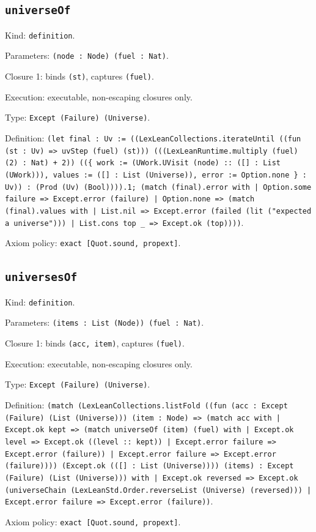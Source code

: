 \documentclass[11pt]{article}
\begin{document}
\subsection*{\texttt{universeOf}}
\noindent Kind: \texttt{definition}.\par
\noindent Parameters: \texttt{(node : Node) (fuel : Nat)}.\par
\noindent Closure 1: binds \texttt{(st)}, captures \texttt{(fuel)}.\par
\noindent Execution: executable, non-escaping closures only.\par
\noindent Type: \texttt{Except (Failure) (Universe)}.\par
\noindent Definition: \texttt{(let final : Uv := ((LexLeanCollections.iterateUntil ((fun (st : Uv) => uvStep (fuel) (st))) (((LexLeanRuntime.multiply (fuel) (2) : Nat) + 2)) ((\{ work := (UWork.UVisit (node) :: ([] : List (UWork))), values := ([] : List (Universe)), error := Option.none \} : Uv)) : (Prod (Uv) (Bool)))).1; (match (final).error with | Option.some failure => Except.error (failure) | Option.none => (match (final).values with | List.nil => Except.error (failed (lit ("expected a universe"))) | List.cons top \_ => Except.ok (top))))}.\par
\noindent Axiom policy: \texttt{exact [Quot.sound, propext]}.\par
\subsection*{\texttt{universesOf}}
\noindent Kind: \texttt{definition}.\par
\noindent Parameters: \texttt{(items : List (Node)) (fuel : Nat)}.\par
\noindent Closure 1: binds \texttt{(acc, item)}, captures \texttt{(fuel)}.\par
\noindent Execution: executable, non-escaping closures only.\par
\noindent Type: \texttt{Except (Failure) (Universe)}.\par
\noindent Definition: \texttt{(match (LexLeanCollections.listFold ((fun (acc : Except (Failure) (List (Universe))) (item : Node) => (match acc with | Except.ok kept => (match universeOf (item) (fuel) with | Except.ok level => Except.ok ((level :: kept)) | Except.error failure => Except.error (failure)) | Except.error failure => Except.error (failure)))) (Except.ok (([] : List (Universe)))) (items) : Except (Failure) (List (Universe))) with | Except.ok reversed => Except.ok (universeChain (LexLeanStd.Order.reverseList (Universe) (reversed))) | Except.error failure => Except.error (failure))}.\par
\noindent Axiom policy: \texttt{exact [Quot.sound, propext]}.\par
\end{document}
